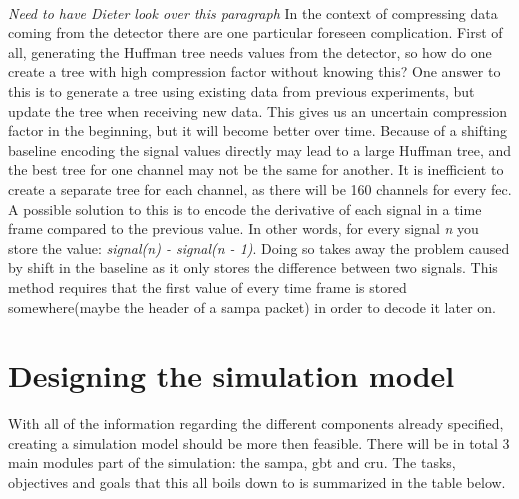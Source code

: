 \documentclass[a4paper, 12pt]{report}
\begin{document}
\paragraph{}
\textit{Need to have Dieter look over this paragraph}
In the context of compressing data coming from the detector there are one particular foreseen complication.
First of all, generating the Huffman tree needs values from the detector, so how do one create a tree with high compression factor without knowing this?
One answer to this is to generate a tree using existing data from previous experiments, but update the tree when receiving new data.
This gives us an uncertain compression factor in the beginning, but it will become better over time.
Because of a shifting baseline encoding the signal values directly may lead to a large Huffman tree, and the best tree for one channel may not be the same for another.
It is inefficient to create a separate tree for each channel, as there will be 160 channels for every \gls{fec}.
A possible solution to this is to encode the derivative of each signal in a time frame compared to the previous value.
In other words, for every signal \textit{n} you store the value: \textit{signal(n) - signal(n - 1)}.
Doing so takes away the problem caused by shift in the baseline as it only stores the difference between two signals.
This method requires that the first value of every time frame is stored somewhere(maybe the header of a \gls{sampa} packet) in order to decode it later on.

\section{Designing the simulation model}
With all of the information regarding the different components already specified, creating a simulation model should be more then feasible.
There will be in total 3 main modules part of the simulation: the \gls{sampa}, \gls{gbt} and \gls{cru}.
The tasks, objectives and goals that this all boils down to is summarized in the table below.
\end{document}
